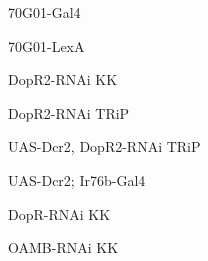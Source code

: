\documentclass[17pt]{extarticle}
\begin{document}
\newpage{}
\vspace*{\fill}\begin{large}
70G01-Gal4 \\[0.5em]
\end{large}
\footnotesize
\vspace*{\fill}
\newpage{}
\vspace*{\fill}\begin{large}
70G01-LexA \\[0.5em]
\end{large}
\footnotesize
\vspace*{\fill}
\newpage{}
\vspace*{\fill}\begin{normalsize}
DopR2-RNAi KK \\[0.5em]
\end{normalsize}
\footnotesize
\vspace*{\fill}
\newpage{}
\vspace*{\fill}\begin{normalsize}
DopR2-RNAi TRiP \\[0.5em]
\end{normalsize}
\footnotesize
\vspace*{\fill}
\newpage{}
\vspace*{\fill}\begin{footnotesize}
UAS-Dcr2, DopR2-RNAi TRiP \\[0.5em]
\end{footnotesize}
\footnotesize
\vspace*{\fill}
\newpage{}
\vspace*{\fill}\begin{small}
UAS-Dcr2; Ir76b-Gal4 \\[0.5em]
\end{small}
\footnotesize
\vspace*{\fill}
\newpage{}
\vspace*{\fill}\begin{normalsize}
DopR-RNAi KK \\[0.5em]
\end{normalsize}
\footnotesize
\vspace*{\fill}
\newpage{}
\vspace*{\fill}\begin{normalsize}
OAMB-RNAi KK \\[0.5em]
\end{normalsize}
\footnotesize
\vspace*{\fill}
\newpage{}
\end{document}
